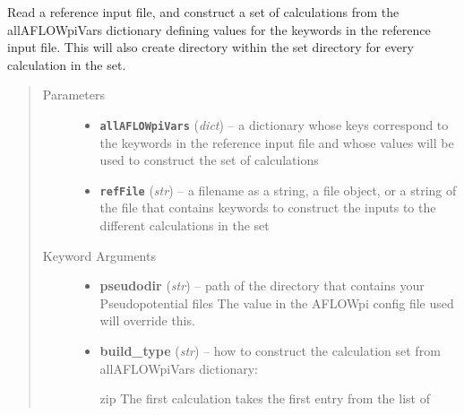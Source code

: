 \documentclass[letterpaper,10pt,english]{sphinxmanual}
\begin{document}
\begin{fulllineitems}
\label{prep:prep.scfs}
Read a reference input file, and construct a set of calculations from the allAFLOWpiVars
dictionary defining values for the keywords in the reference input file. This will
also create directory within the set directory for every calculation in the set.
\begin{quote}\begin{description}
\item[{Parameters}] \leavevmode\begin{itemize}
\item {} 
\textbf{\texttt{allAFLOWpiVars}} (\emph{dict}) -- a dictionary whose keys correspond to the keywords in the
reference input file and whose values will be used to
construct the set of calculations

\item {} 
\textbf{\texttt{refFile}} (\emph{str}) -- a filename as a string, a file object, or a string of the file
that contains keywords to construct the inputs to the different
calculations in the set

\end{itemize}

\item[{Keyword Arguments}] \leavevmode\begin{itemize}
\item {} 
\textbf{pseudodir} (\emph{str}) --
path of the directory that contains your Pseudopotential files
The value in the AFLOWpi config file used will override this.

\item {} 
\textbf{build\_type} (\emph{str}) --
how to construct the calculation set from allAFLOWpiVars dictionary:
\begin{description}
\item[{zip \textbar{} The first calculation takes the first entry from the list of}] \leavevmode
{}


\end{description}
\end{itemize}
\end{description}
\end{quote}
\end{fulllineitems}
\end{document}

